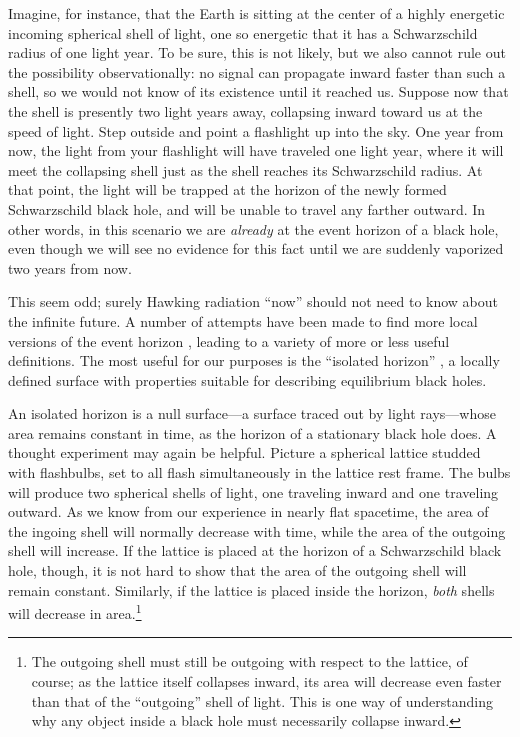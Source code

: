 \documentclass[11pt]{article}
\begin{document}
\begin{appendix}
Imagine, for instance, that the Earth is sitting at the center of a highly 
energetic incoming spherical shell of light, one so energetic that 
it has a Schwarzschild radius of one light year.  To be sure, this is 
not likely, but we also cannot rule out the possibility observationally:
no signal can propagate inward faster than such a shell, so we 
would not know of its existence until it reached us.  Suppose now
that the shell is presently two light years away, collapsing inward
toward us at the speed of light.  Step outside and point a flashlight 
up into the sky.  One year from now, the light from your flashlight
will have traveled one light year, where it will meet the collapsing 
shell just as the shell reaches its Schwarzschild radius.  At that 
point, the light will be trapped at the horizon of the newly formed
Schwarzschild black hole, and will be unable to travel any farther 
outward.  In other words, in this scenario we are \emph{already} at 
the event horizon of a black hole, even though we will see no
evidence for this fact until we are suddenly vaporized two years 
from now.

This seem odd; surely Hawking radiation ``now'' should not need to
know about the infinite future.  A number of attempts have been made 
to find more local versions of the event horizon \cite{Boothb},
leading to a variety of more or less useful definitions.  The 
most useful for our purposes is the ``isolated horizon'' \cite{Ashisol},
a locally defined surface with properties suitable for 
describing equilibrium black holes.  

An isolated horizon is a null surface---a surface traced out by light 
rays---whose area remains constant in time, as the horizon of a 
stationary black hole does.  A thought experiment may again be helpful.  
Picture a spherical lattice studded with flashbulbs, set to all flash 
simultaneously in the lattice rest frame.   The bulbs will produce two 
spherical shells of light, one traveling inward and one traveling outward.  
As we know from our experience in nearly flat spacetime, the area of
the ingoing shell will normally decrease with time, while the area 
of the outgoing shell will increase.  If the lattice is placed at the 
horizon of a Schwarzschild black hole, though, it is not hard to 
show that the area of the outgoing shell will remain constant.  
Similarly, if the lattice is placed inside the horizon, \emph{both} 
shells will decrease in area.\footnote{The outgoing shell must
still be outgoing with respect to the lattice, of course; as the lattice 
itself collapses inward, its area will decrease even faster than that 
of the ``outgoing'' shell of light.  This is one way of understanding 
why any object inside a black hole must necessarily collapse inward.}   


\end{appendix}
\end{document}
